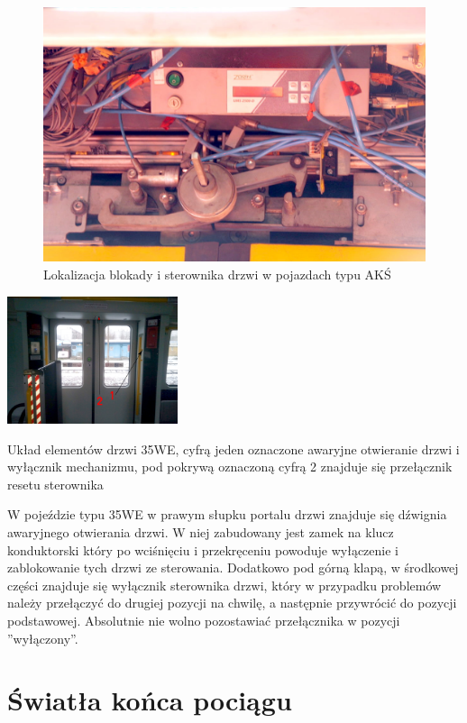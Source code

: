 \begin{figure}
	\includegraphics[width=12cm]{skryptkierownik-img/skryptkierownik-img059.jpg}
	\caption{Lokalizacja blokady i sterownika drzwi w pojazdach typu AKŚ}
\end{figure}
\begin{marginfigure}
	\includegraphics[width=5cm]{skryptkierownik-img/35we-drzwi.png}
	\caption{Układ elementów drzwi 35WE, cyfrą jeden oznaczone awaryjne otwieranie drzwi i wyłącznik mechanizmu, pod pokrywą oznaczoną cyfrą 2 znajduje się przełącznik resetu sterownika}
\end{marginfigure}

W pojeździe typu 35WE w prawym słupku portalu drzwi znajduje się dźwignia awaryjnego otwierania drzwi. W niej zabudowany jest zamek na klucz konduktorski który po wciśnięciu i przekręceniu powoduje wyłączenie i zablokowanie tych drzwi ze sterowania. Dodatkowo pod górną klapą, w środkowej części znajduje się wyłącznik sterownika drzwi, który w przypadku problemów należy przełączyć do drugiej pozycji na chwilę, a następnie przywrócić do pozycji podstawowej. Absolutnie nie wolno pozostawiać przełącznika w pozycji ''wyłączony''. 

\section{Światła końca pociągu}

